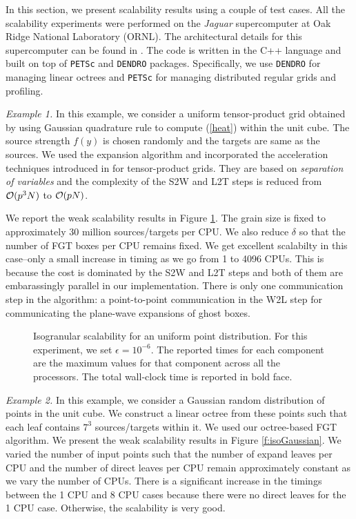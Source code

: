 
In this section, we present scalability results using a couple of test cases.  All the scalability experiments were performed 
on the {\it{Jaguar}} supercomputer at Oak Ridge National Laboratory (ORNL). The architectural details for this supercomputer
 can be found in \cite{jaguar}. The code is written in the C++ language and built on top of \texttt{PETSc} and \texttt{DENDRO} packages. 
 Specifically, we use \texttt{DENDRO} for managing linear octrees and \texttt{PETSc} for managing distributed regular grids and profiling. 

{\em Example 1.} In this example, we consider a uniform tensor-product grid obtained by using Gaussian quadrature rule to
 compute (\ref{heat}) within the unit cube. The source strength $f(y)$ is chosen randomly and the targets are same as the
  sources. We used the expansion algorithm and incorporated the acceleration techniques
  introduced in \cite{fggt} for tensor-product grids. They are based on {\em separation of variables} and
  the complexity of the S2W and L2T steps is reduced from $\mathcal{O}(p^3 N)$ to $\mathcal{O}(p N)$. 

We report the weak scalability results in Figure \ref{f:isoUniform}. The grain size is fixed to approximately 30 million 
sources/targets per CPU. We also reduce $\delta$ so that the number of FGT boxes per CPU remains fixed. We get excellent
 scalabilty in this case--only a small increase in timing as we go from 1 to 4096 CPUs. This is  because the cost is dominated 
 by the S2W and L2T steps and both of them are embarassingly parallel in our implementation. There is only one communication 
 step in the algorithm: a point-to-point communication in the W2L step for communicating the plane-wave expansions of ghost boxes.

\begin{figure}
	\begin{center}
	
	\end{center}
\caption{\label{f:isoUniform} Isogranular scalability for an uniform point distribution. For
 this experiment, we set $\epsilon = 10^{-6}$. The reported times for 
each component are the maximum values for that component across all the processors. The total wall-clock
time is reported in bold face.} 
\end{figure}

{\em Example 2.} In this example, we consider a Gaussian random distribution of points in the unit cube. We construct
a linear octree from these points such that each leaf contains $7^3$ sources/targets within it. We used 
 our octree-based FGT algorithm. We present the weak scalability results in Figure \ref{f:isoGaussian}. We varied the
 number of input points such that the number of expand leaves per CPU and the number of direct leaves per CPU remain
  approximately constant as we vary the number of CPUs. There is a significant increase in the timings between the 
  1 CPU and 8 CPU cases because there were no direct leaves for the 1 CPU case. Otherwise, the scalability is very good.

